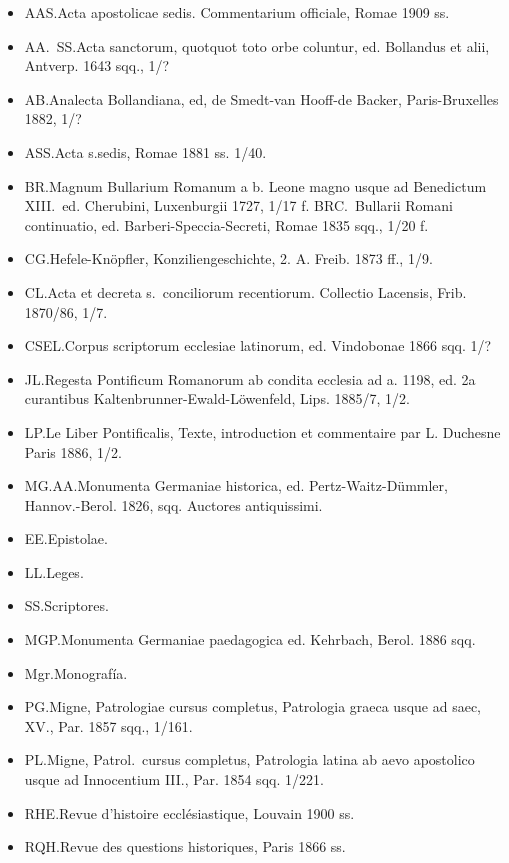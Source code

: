 \raggedbottom{} \documentclass[12pt, a4paper, openany]{book} %
\begin{document}
\begin{itemize}
  \item AAS.\@ Acta apostolicae sedis. Commentarium officiale, Romae 1909 ss.
  \item AA.\ SS.\@ Acta sanctorum, quotquot toto orbe coluntur, ed. Bollandus et alii, Antverp. 1643 sqq., 1/?
  \item AB.\@ Analecta Bollandiana, ed, de Smedt-van Hooff-de Backer, Paris-Bruxelles 1882, 1/?
  \item ASS.\@ Acta s.\@ sedis, Romae 1881 ss. 1/40.
  \item BR.\@ Magnum Bullarium Romanum a b. Leone magno usque ad Benedictum XIII.\ ed. Cherubini, Luxenburgii 1727, 1/17 f. BRC.\ Bullarii Romani continuatio, ed. Barberi-Speccia-Secreti, Romae 1835 sqq., 1/20 f.
  \item CG.\@ Hefele-Knöpfler, Konziliengeschichte, 2. A. Freib. 1873 ff., 1/9.
  \item CL.\@ Acta et decreta s.\ conciliorum recentiorum. Collectio Lacensis, Frib. 1870/86, 1/7.
  \item CSEL.\@ Corpus scriptorum ecclesiae latinorum, ed. Vindobonae 1866 sqq. 1/?
  \item JL.\@ Regesta Pontificum Romanorum ab condita ecclesia ad a. 1198, ed. 2a curantibus Kaltenbrunner-Ewald-Löwenfeld, Lips. 1885/7, 1/2.
  \item LP.\@ Le Liber Pontificalis, Texte, introduction et commentaire par L. Duchesne Paris 1886, 1/2.
  \item MG.\@ AA.\@ Monumenta Germaniae historica, ed. Pertz-Waitz-Dümmler, Hannov.-Berol. 1826, sqq. Auctores antiquissimi.
  \item EE.\@ Epistolae.
  \item LL.\@ Leges.
  \item SS.\@ Scriptores.
  \item MGP.\@ Monumenta Germaniae paedagogica ed. Kehrbach, Berol. 1886 sqq.
  \item Mgr.\@ Monografía.

  \item PG.\@ Migne, Patrologiae cursus completus, Patrologia graeca usque ad saec, XV., Par. 1857 sqq., 1/161.

  \item PL.\@ Migne, Patrol.\ cursus completus, Patrologia latina ab aevo apostolico usque ad Innocentium III., Par. 1854 sqq. 1/221.
  \item RHE.\@ Revue d'histoire ecclésiastique, Louvain 1900 ss.
  \item RQH.\@ Revue des questions historiques, Paris 1866 ss.
\end{itemize}
\end{document}
